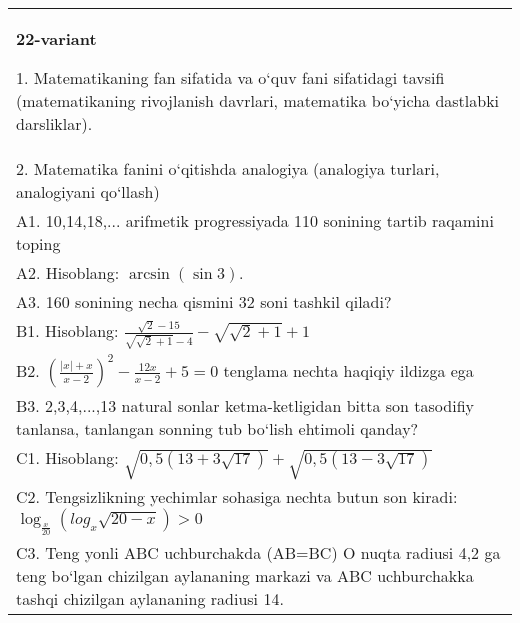 \documentclass{article}
\begin{document}
\begin{tabular}{m{17cm}}
\textbf{22-variant}

1. Matematikaning fan sifatida va o‘quv fani sifatidagi tavsifi (matematikaning rivojlanish davrlari, matematika bo‘yicha dastlabki darsliklar). \\
2. Matematika fanini o‘qitishda analogiya (analogiya turlari, analogiyani qo‘llash) \\
A1. 10,14,18,... arifmetik progressiyada 110 sonining tartib raqamini toping \\
A2. Hisoblang: \(\arcsin (\sin3) \). \\
A3. 160 sonining necha qismini 32 soni tashkil qiladi? \\
B1. Hisoblang: \(\frac{\sqrt{2} - 15}{\sqrt{\sqrt{2} + 1} - 4} - \sqrt{\sqrt{2} + 1} + 1\) \\
B2. $ (\frac{|x| + x}{x-2}) ^{2} - \frac{12x}{x-2} + 5 = 0$ tenglama nechta haqiqiy ildizga ega \\
B3. 2,3,4,...,13 natural sonlar ketma-ketligidan bitta son tasodifiy tanlansa, tanlangan sonning tub bo‘lish ehtimoli qanday? \\
C1. Hisoblang: \(\sqrt{0,5 (13 + 3\sqrt{17}) } + \sqrt{0,5 (13 - 3\sqrt{17}) }\) \\
C2. Tengsizlikning yechimlar sohasiga nechta butun son kiradi: \(\log_{\frac{x}{20}} (log_{x}\sqrt{20 - x}) > 0\) \\
C3. Teng yonli ABC uchburchakda (AB=BC) O nuqta radiusi 4,2 ga teng bo‘lgan chizilgan aylananing markazi va ABC uchburchakka tashqi chizilgan aylananing radiusi 14. \\

\end{tabular}
\vspace{1cm}
\end{document}
